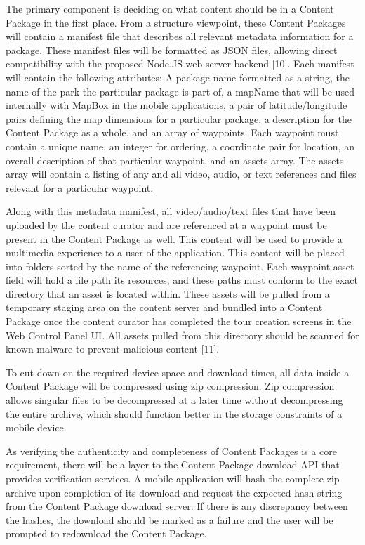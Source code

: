 \documentclass[letterpaper, 10pt,titlepage]{article}
\begin{document}
The primary component is deciding on what content should be in a Content Package in the first place. From a structure viewpoint, these Content Packages will contain a manifest file that describes all relevant metadata information for a package. These manifest files will be formatted as JSON files, allowing direct compatibility with the proposed Node.JS web server backend [10]. Each manifest will contain the following attributes: A package name formatted as a string, the name of the park the particular package is part of, a mapName that will be used internally with MapBox in the mobile applications, a pair of latitude/longitude pairs defining the map dimensions for a particular package, a description for the Content Package as a whole, and an array of waypoints. Each waypoint must contain a unique name, an integer for ordering, a coordinate pair for location, an overall description of that particular waypoint, and an assets array. The assets array will contain a listing of any and all video, audio, or text references and files relevant for a particular waypoint.

Along with this metadata manifest, all video/audio/text files that have been uploaded by the content curator and are referenced at a waypoint must be present in the Content Package as well. This content will be used to provide a multimedia experience to a user of the application. This content will be placed into folders sorted by the name of the referencing waypoint. Each waypoint asset field will hold a file path its resources, and these paths must conform to the exact directory that an asset is located within. These assets will be pulled from a temporary staging area on the content server and bundled into a Content Package once the content curator has completed the tour creation screens in the Web Control Panel UI. All assets pulled from this directory should be scanned for known malware to prevent malicious content [11].

To cut down on the required device space and download times, all data inside a Content Package will be compressed using zip compression. Zip compression allows singular files to be decompressed at a later time without decompressing the entire archive, which should function better in the storage constraints of a mobile device.

As verifying the authenticity and completeness of Content Packages is a core requirement, there will be a layer to the Content Package download API that provides verification services. A mobile application will hash the complete zip archive upon completion of its download and request the expected hash string from the Content Package download server. If there is any discrepancy between the hashes, the download should be marked as a failure and the user will be prompted to redownload the Content Package.
\end{document}

